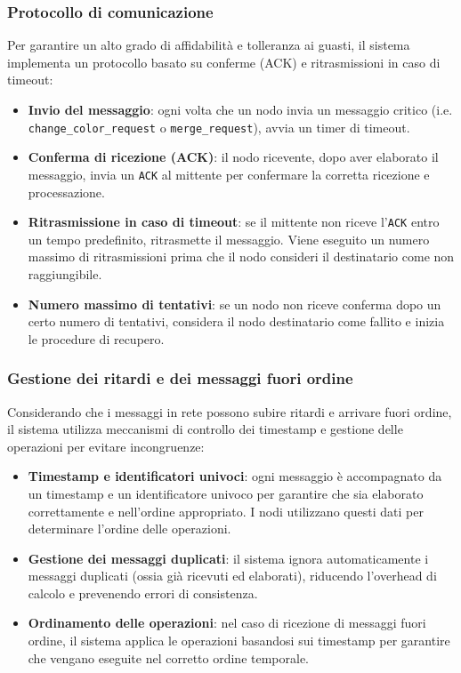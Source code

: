 \documentclass[12pt, a4paper]{report}
\begin{document}
\newpage
\subsubsection{Protocollo di comunicazione}
\label{subsec:ack}
Per garantire un alto grado di affidabilit\`a e tolleranza ai guasti, il sistema implementa un protocollo basato su conferme (ACK) e ritrasmissioni in caso di timeout:

\begin{itemize}
    \item \textbf{Invio del messaggio}: ogni volta che un nodo invia un messaggio critico (i.e. \\\texttt{change\_color\_request} o \texttt{merge\_request}), avvia un timer di timeout.
    \item \textbf{Conferma di ricezione (ACK)}: il nodo ricevente, dopo aver elaborato il messaggio, invia un \texttt{ACK} al mittente per confermare la corretta ricezione e processazione.
    \item \textbf{Ritrasmissione in caso di timeout}: se il mittente non riceve l'\texttt{ACK} entro un tempo predefinito, ritrasmette il messaggio. Viene eseguito un numero massimo di ritrasmissioni prima che il nodo consideri il destinatario come non raggiungibile.
    \item \textbf{Numero massimo di tentativi}: se un nodo non riceve conferma dopo un certo numero di tentativi, considera il nodo destinatario come fallito e inizia le procedure di recupero.
\end{itemize}

\subsubsection{Gestione dei ritardi e dei messaggi fuori ordine}

Considerando che i messaggi in rete possono subire ritardi e arrivare fuori ordine, il sistema utilizza meccanismi di controllo dei timestamp e gestione delle operazioni per evitare incongruenze:

\begin{itemize}
    \item \textbf{Timestamp e identificatori univoci}: ogni messaggio \`e accompagnato da un timestamp e un identificatore univoco per garantire che sia elaborato correttamente e nell'ordine appropriato. I nodi utilizzano questi dati per determinare l'ordine delle operazioni.
    \item \textbf{Gestione dei messaggi duplicati}: il sistema ignora automaticamente i messaggi duplicati (ossia gi\`a ricevuti ed elaborati), riducendo l'overhead di calcolo e prevenendo errori di consistenza.
    \item \textbf{Ordinamento delle operazioni}: nel caso di ricezione di messaggi fuori ordine, il sistema applica le operazioni basandosi sui timestamp per garantire che vengano eseguite nel corretto ordine temporale.
\end{itemize}
\newpage
\end{document}

